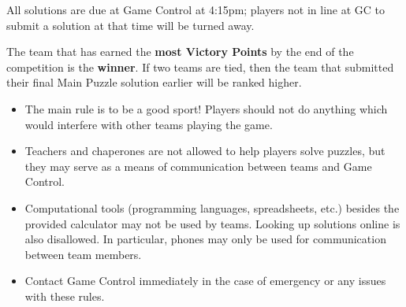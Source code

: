 All solutions are due at Game Control at 4:15pm;
players not in line at GC to submit a solution at that time will be turned away.


The team that has earned the \textbf{most Victory Points} by the end of the
competition is the \textbf{winner}. If two teams are tied,
then the team that submitted their final Main Puzzle solution
earlier will be ranked higher.


\begin{itemize}
\item The main rule is to be a good sport! Players should not do anything which
would interfere with other teams playing the game.
\item Teachers and chaperones are not allowed to help players solve puzzles,
but they may serve as a means of communication between teams and Game Control.
\item Computational tools (programming languages, spreadsheets, etc.) besides
the provided calculator may not be used by teams. Looking up solutions online
is also disallowed. In particular, phones
may only be used for communication between team members.
\item Contact Game Control immediately in the case of emergency
or any issues with these rules.
\end{itemize}
